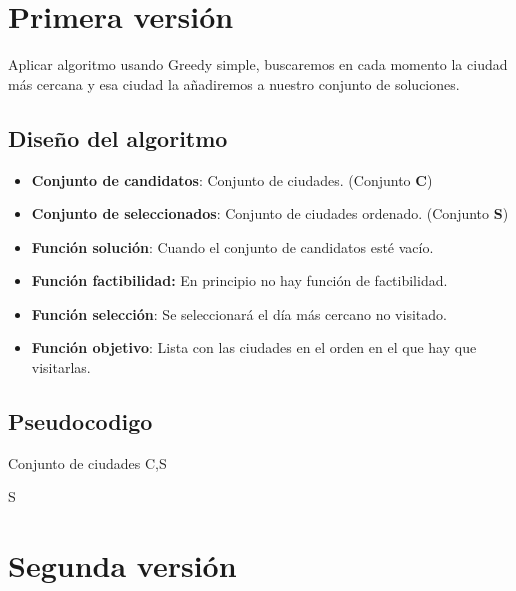 	
	
	\section{Primera versión} 


		Aplicar algoritmo usando Greedy simple, buscaremos en cada momento la ciudad más cercana y esa ciudad
		la añadiremos a nuestro conjunto de soluciones. 
		
	
	
	\subsection{Diseño del algoritmo} 
	
			\begin{itemize}
			\item \textbf{Conjunto de candidatos}: Conjunto de ciudades. (Conjunto \textbf{C})
			\item \textbf{Conjunto de seleccionados}: Conjunto de ciudades ordenado. (Conjunto \textbf{S})
			\item \textbf{Función solución}: Cuando el conjunto de candidatos esté vacío.
			\item \textbf{Función factibilidad:} En principio no hay función de factibilidad.
			\item \textbf{Función selección}: Se seleccionará el día más cercano no visitado.
			\item \textbf{Función objetivo}: Lista con las ciudades en el orden en el que hay que visitarlas.		
		\end{itemize}
		
		
	\subsection{Pseudocodigo}
	
		
		\begin{algorithmic}
			\Require Conjunto de ciudades C,S
			\EndIf
			\EndFor  
			
			\Return S	
		\end{algorithmic}	
	
	
	
	\section{Segunda versión} 
	
